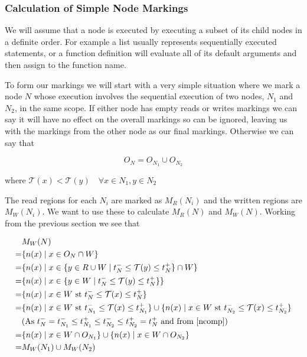 \documentclass[twoside,a4paper]{report}
\begin{document}
\subsubsection{Calculation of Simple Node Markings}

We will assume that a node is executed by executing a subset of its child nodes in a definite order. For example a list usually represents
sequentially executed statements, or a function definition will evaluate all of its default arguments and then assign to the function name.

To form our markings we will start with a very simple situation where we mark a node $N$ whose execution involves the sequential execution of two nodes,
$N_1$ and $N_2$, in the same scope. If either node has empty reads or writes markings we can say it will have no effect on the overall markings so can be ignored,
leaving us with the markings from the other node as our final markings. Otherwise we can say that

\begin{equation}\label{ncomp}
O_N = O_{N_1} \cup O_{N_2}
\end{equation}

where $\mathcal{T}(x) < \mathcal{T}(y) \quad \forall x \in N_1, y \in N_2$

The read regions for each $N_i$ are marked as $M_R(N_i)$ and the written regions are $M_W(N_i)$. We want to use these to calculate $M_R(N)$ and $M_W(N)$. Working
from the previous section we see that

\begin{align*}
& M_W(N) \\
=& \{ n(x) \mid x \in O_N \cap W \} \\
=& \{ n(x) \mid x \in \{y \in R \cup W \mid t^{-}_N \le \mathcal{T}(y) \le t^+_N \} \cap W \} \\
=& \{ n(x) \mid x \in \{y \in W \mid t^{-}_N \le \mathcal{T}(y) \le t^+_N \} \} \\
=& \{ n(x) \mid x \in W \text{ st } t^{-}_N \le \mathcal{T}(x) \le t^+_N \} \\
=& \{ n(x) \mid x \in W \text{ st } t^{-}_{N_1} \le \mathcal{T}(x) \le t^+_{N_1} \} \cup
   \{ n(x) \mid x \in W \text{ st } t^{-}_{N_2} \le \mathcal{T}(x) \le t^+_{N_2} \} \\
&  \text{(As } t^-_N = t^-_{N_1} \le t^+_{N_1} \le t^-_{N_2} \le t^+_{N_2} = t^+_N \text{ and from \eqref{ncomp})} \\
=& \{ n(x) \mid x \in W \cap O_{N_1} \} \cup \{ n(x) \mid x \in W \cap O_{N_2} \} \\
=& M_W(N_1) \cup M_W(N_2)
\end{align*}
\end{document}
